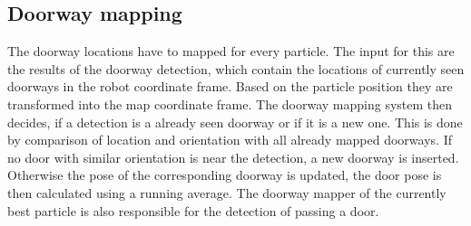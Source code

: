 
\subsection{Doorway mapping}

The doorway locations have to mapped for every particle. The input for this are the results of the doorway detection, which contain the locations of currently seen doorways in the robot coordinate frame. Based on the particle position they are transformed into the map coordinate frame. The doorway mapping system then decides, if a detection is a already seen doorway or if it is a new one. This is done by comparison of location and orientation with all already mapped doorways. If no door with similar orientation is near the detection, a new doorway is inserted. Otherwise the pose of the corresponding doorway is updated, the door pose is then calculated using a running average. The doorway mapper of the currently best particle is also responsible for the detection of passing a door.